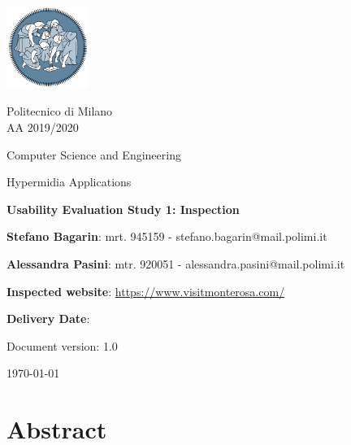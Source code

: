 \documentclass[a4paper,12pt]{report}
\begin{document}
	\begin{titlepage}
		\centering
		\includegraphics[width=0.20\textwidth]{./assets/polimi-logo.png}\par

		{Politecnico di Milano \\ AA 2019/2020} \par
		\vspace{1.5cm}

		{Computer Science and Engineering}\par
		\Large{Hypermidia Applications}\par
		\vspace{1.0cm}

		{\LARGE \textbf{Usability Evaluation Study 1: Inspection} \par}
		\vspace{1.5cm}

		{\normalsize {\textbf{Stefano Bagarin}: mrt. 945159 -  stefano.bagarin@mail.polimi.it }\par}
		\vspace{0.2cm}
		{\normalsize{\textbf{Alessandra Pasini}: mtr. 920051 - alessandra.pasini@mail.polimi.it}\par}
		\vspace{1.0cm}
		
		{\normalsize {\textbf{Inspected website}: \url{https://www.visitmonterosa.com/}}\par}
		\vspace{0.2cm}
		{\normalsize {\textbf{Delivery Date}: }\par}
		\vfill

		{\large Document version: 1.0\par}
		{\large \today \par}
	\end{titlepage}

	\tableofcontents

	\chapter{Abstract}
	\label{ch:Abstract}

	
\end{document}
